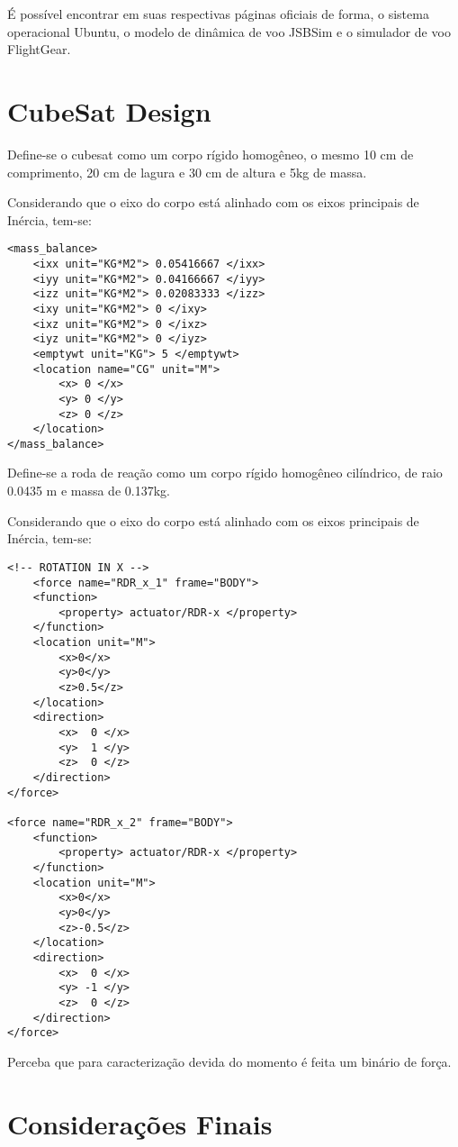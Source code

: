 É possível encontrar em suas respectivas páginas oficiais de forma, o sistema operacional Ubuntu, o modelo de dinâmica de voo JSBSim e o simulador de voo FlightGear.

\section{CubeSat Design}

Define-se o cubesat como um corpo rígido homogêneo, o mesmo 10 cm de comprimento, 20 cm de lagura e 30 cm de altura e 5kg de massa.

Considerando que o eixo do corpo está alinhado com os eixos principais de Inércia, tem-se:

\begin{verbatim}
<mass_balance>
	<ixx unit="KG*M2"> 0.05416667 </ixx>
	<iyy unit="KG*M2"> 0.04166667 </iyy>
	<izz unit="KG*M2"> 0.02083333 </izz>
	<ixy unit="KG*M2"> 0 </ixy>
	<ixz unit="KG*M2"> 0 </ixz>
	<iyz unit="KG*M2"> 0 </iyz>
	<emptywt unit="KG"> 5 </emptywt>
	<location name="CG" unit="M">
		<x> 0 </x>
		<y> 0 </y>
		<z> 0 </z>
	</location>
</mass_balance>

\end{verbatim}

Define-se a roda de reação como um corpo rígido homogêneo cilíndrico, de raio 0.0435 m e massa de 0.137kg.

Considerando que o eixo do corpo está alinhado com os eixos principais de Inércia, tem-se:

\begin{verbatim}
<!-- ROTATION IN X -->
	<force name="RDR_x_1" frame="BODY">
	<function>
		<property> actuator/RDR-x </property>
	</function>
	<location unit="M">
		<x>0</x>
		<y>0</y>
		<z>0.5</z>
	</location>
	<direction>
		<x>  0 </x>
		<y>  1 </y>
		<z>  0 </z>
	</direction>
</force>

<force name="RDR_x_2" frame="BODY">
	<function>
		<property> actuator/RDR-x </property>
	</function>
	<location unit="M">
		<x>0</x>
		<y>0</y>
		<z>-0.5</z>
	</location>
	<direction>
		<x>  0 </x>
		<y> -1 </y>
		<z>  0 </z>
	</direction>
</force>
\end{verbatim}

Perceba que para caracterização devida do momento é feita um binário de força.

\section{Considerações Finais}



